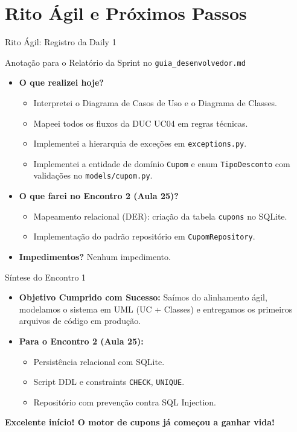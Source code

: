 \documentclass[10pt]{beamer}
\begin{document}
\section{Rito Ágil e Próximos Passos}

\begin{frame}{Rito Ágil: Registro da Daily 1}
    \begin{block}{Anotação para o Relatório da Sprint no \texttt{guia\_desenvolvedor.md}}
    \begin{itemize}
        \item \textbf{O que realizei hoje?}
        \begin{itemize}
            \item Interpretei o Diagrama de Casos de Uso e o Diagrama de Classes.
            \item Mapeei todos os fluxos da DUC UC04 em regras técnicas.
            \item Implementei a hierarquia de exceções em \texttt{exceptions.py}.
            \item Implementei a entidade de domínio \texttt{Cupom} e enum \texttt{TipoDesconto} com validações no \texttt{models/cupom.py}.
        \end{itemize}
        \item \textbf{O que farei no Encontro 2 (Aula 25)?}
        \begin{itemize}
            \item Mapeamento relacional (DER): criação da tabela \texttt{cupons} no SQLite.
            \item Implementação do padrão repositório em \texttt{CupomRepository}.
        \end{itemize}
        \item \textbf{Impedimentos?} Nenhum impedimento.
    \end{itemize}
    \end{block}
\end{frame}

\begin{frame}{Síntese do Encontro 1}
    \begin{itemize}
        \item \textbf{Objetivo Cumprido com Sucesso:} Saímos do alinhamento ágil, modelamos o sistema em UML (UC + Classes) e entregamos os primeiros arquivos de código em produção.
        \item \textbf{Para o Encontro 2 (Aula 25):}
        \begin{itemize}
            \item Persistência relacional com SQLite.
            \item Script DDL e constraints \texttt{CHECK}, \texttt{UNIQUE}.
            \item Repositório com prevenção contra SQL Injection.
        \end{itemize}
    \end{itemize}
    \vspace{0.4cm}
    \centering
    \textbf{Excelente início! O motor de cupons já começou a ganhar vida!}
\end{frame}
\end{document}
